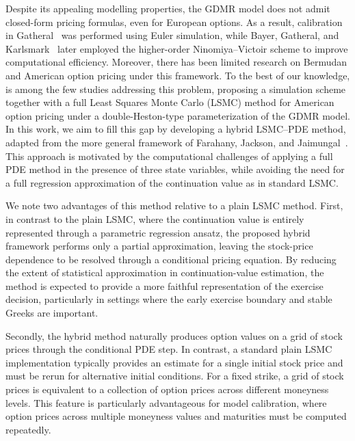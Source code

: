 \documentclass[pdflatex,sn-mathphys-num]{sn-jnl}
\theoremstyle{thmstyleone}%
\theoremstyle{thmstylethree}%
\theoremstyle{thmstyletwo}%
\begin{document}
Despite its appealing modelling properties, the GDMR model does not admit closed-form pricing formulas, even for European options. As a result, calibration in Gatheral~\cite{gatheral2008} was performed using Euler simulation, while Bayer, Gatheral, and Karlsmark~\cite{bayer2013fast} later employed the higher-order Ninomiya--Victoir scheme to improve computational efficiency. Moreover, there has been limited research on Bermudan and American option pricing under this framework. To the best of our knowledge, \cite{haida2026almost} is among the few studies addressing this problem, proposing a simulation scheme together with a full Least Squares Monte Carlo (LSMC) method for American option pricing under a double-Heston-type parameterization of the GDMR model. In this work, we aim to fill this gap by developing a hybrid LSMC--PDE method, adapted from the more general framework of Farahany, Jackson, and Jaimungal~\cite{farahany2020mixing}. This approach is motivated by the computational challenges of applying a full PDE method in the presence of three state variables, while avoiding the need for a full regression approximation of the continuation value as in standard LSMC.


We note two advantages of this method relative to a plain LSMC method. First, in contrast to the plain LSMC, where the continuation value is entirely represented through a parametric regression ansatz, the proposed hybrid framework performs only a partial approximation, leaving the stock-price dependence to be resolved through a conditional pricing equation. By reducing the extent of statistical approximation in continuation-value estimation, the method is expected to provide a more faithful representation of the exercise decision, particularly in settings where the early exercise boundary and stable Greeks are important.

Secondly, the hybrid method naturally produces option values on a grid of stock prices through the conditional PDE step. In contrast, a standard plain LSMC implementation typically provides an estimate for a single initial stock price and must be rerun for alternative initial conditions. For a fixed strike, a grid of stock prices is equivalent to a collection of option prices across different moneyness levels. This feature is particularly advantageous for model calibration, where option prices across multiple moneyness values and maturities must be computed repeatedly.
\end{document}
